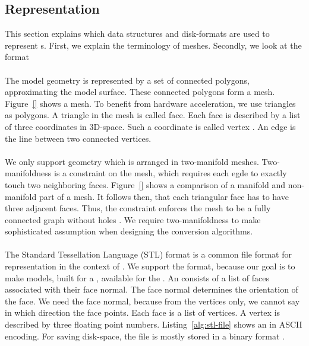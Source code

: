 \documentclass[../ClassicThesis.tex]{subfiles}
\begin{document}
\subsection{{\threedmodel} Representation}
\label{sub:model-representation}

This section explains which data structures and disk-formats are used
to represent {\threedmodel}s. First, we explain the terminology of
meshes. Secondly, we look at the {\stlfile} format\\
\\
The model geometry is represented by a set of connected polygons,
approximating the model surface. These connected polygons form a mesh.
Figure~\ref{} shows a mesh. To benefit from hardware acceleration, we use
triangles as polygons. A triangle in the mesh is called face. Each
face is described by a list of three coordinates in 3D-space. Such a
coordinate is called vertex \cite[p.~3]{cg-intro}. An edge is the line
between two connected vertices.\\
\\
We only support geometry which is arranged in two-manifold meshes.
Two-manifoldness is a constraint on the mesh, which requires each egde
to exactly touch two neighboring faces. Figure~\ref{}
shows a comparison of a manifold and non-manifold part of a mesh. It
follows then, that each triangular face has to have three adjacent
faces. Thus, the constraint enforces the mesh to be a fully connected
graph without holes \cite[p.~28]{master-thesis}. We require
two-manifoldness to make
sophisticated assumption when designing the conversion algorithms.\\
\\
The Standard Tessellation Language (STL) format is a common file
format for {\threedmodel} representation in the context of
{\threedprinting}. We support the {\stlfile} format, because our goal
is to make models, built for a {\threedprinter}, available for the
{\lasercutter}. An {\stlfile} consists of a list of faces associated
with their face normal. The face normal determines the orientation of
the face. We need the face normal, because from the vertices only, we
cannot say in which direction the face points. Each face is a list of
vertices. A vertex is described by three floating point numbers.
Listing~\ref{alg:stl-file} shows an {\stlfile} in ASCII encoding. For
saving disk-space, the file is mostly stored in a binary format
\cite[p.~8]{stl-file}.
\end{document}
